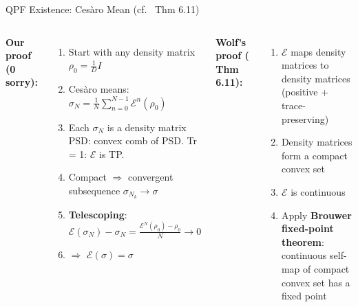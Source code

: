 \documentclass[aspectratio=169,10pt]{beamer}
\begin{document}
\begin{frame}{QPF Existence: Ces\`aro Mean \textnormal{(cf.\ \cite{Wolf2012Quantum} Thm 6.11)}}
    \vspace{-0.3em}

    \begin{columns}[T]
        \textbf{\textcolor{leangreen}{Our proof} (0 sorry):}
        \begin{enumerate}\itemsep0.1em\small
            \item Start with any density matrix $\rho_0 = \tfrac{1}{D}I$
            \item Ces\`aro means:
                $\sigma_N = \tfrac{1}{N}\sum_{n=0}^{N-1} \mathcal{E}^n(\rho_0)$
            \item Each $\sigma_N$ is a density matrix\\
                {\tiny PSD: convex comb of PSD. \quad Tr = 1: $\mathcal{E}$ is TP.}
            \item Compact $\Rightarrow$ convergent subsequence $\sigma_{N_k} \to \sigma$
            \item \textbf{Telescoping}: $\mathcal{E}(\sigma_N) - \sigma_N = \frac{\mathcal{E}^N(\rho_0) - \rho_0}{N} \to 0$
            \item $\Rightarrow$ $\mathcal{E}(\sigma) = \sigma$ 
        \end{enumerate}

        \textbf{\textcolor{dimwhite}{Wolf's proof} (\cite{Wolf2012Quantum} Thm 6.11):}
        \begin{enumerate}\itemsep0.1em\small\color{dimwhite}
            \item $\mathcal{E}$ maps density matrices to density matrices\\
                {\tiny (positive + trace-preserving)}
            \item Density matrices form a compact convex set
            \item $\mathcal{E}$ is continuous
            \item Apply \textbf{Brouwer fixed-point theorem}:\\
                continuous self-map of compact convex set has a fixed point
        \end{enumerate}


\end{columns}
\end{frame}
\end{document}
